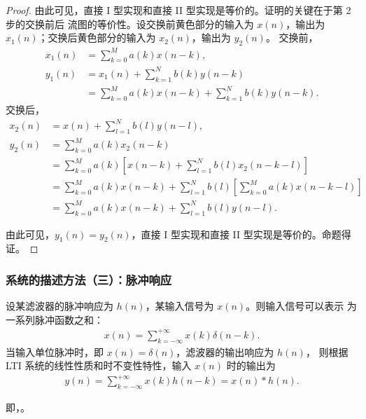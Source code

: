 \begin{proof}
    由此可见，直接 I 型实现和直接 II 型实现是等价的。证明的关键在于第 2 步的交换前后
    流图的等价性。设交换前黄色部分的输入为 $x(n)$，输出为 $x_1(n)$；交换后黄色部分的输入为 $x_2(n)$，输出为 $y_2(n)$。
    交换前，
    \begin{align*}
        x_1(n) & = \sum_{k = 0}^{M}a(k)x(n - k), \\
        y_1(n) & = x_1(n) + \sum_{k = 1}^{N}b(k)y(n - k) \\
        & = \sum_{k = 0}^{M}a(k)x(n - k) + \sum_{k = 1}^{N}b(k)y(n - k).
    \end{align*}
    交换后，
    \begin{align*}
        x_2(n) & = x(n) + \sum_{l = 1}^{N}b(l)y(n - l), \\
        y_2(n) & = \sum_{k = 0}^{M}a(k)x_2(n - k) \\
        & = \sum_{k = 0}^{M}a(k)[x(n - k) + \sum_{l = 1}^{N}b(l)x_2(n - k - l)] \\
        & = \sum_{k = 0}^{M}a(k)x(n - k) + \sum_{l = 1}^{N}b(l)[\sum_{k = 0}^{M}a(k)x(n - k - l)] \\
        & = \sum_{k = 0}^{M}a(k)x(n - k) + \sum_{l = 1}^{N}b(l)y(n - l).
    \end{align*}

    由此可见，$y_1(n) = y_2(n)$，直接 I 型实现和直接 II 型实现是等价的。命题得证。
\end{proof}

\subsubsection{系统的描述方法（三）：脉冲响应}

\label{subsubsection:pulse-response-representation}

\begin{theorem}
    设某滤波器的脉冲响应为 $h(n)$，某输入信号为 $x(n)$。则输入信号可以表示
    为一系列脉冲函数之和：
    \begin{align*}
        x(n) = \sum_{k = -\infty}^{+\infty}x(k)\delta(n - k).
    \end{align*}
    当输入单位脉冲时，即 $x(n) = \delta(n)$，滤波器的输出响应为 $h(n)$，
    则根据 LTI 系统的线性性质和时不变性特性，输入 $x(n)$ 时的输出为
    \begin{align*}
        y(n) = \sum_{k = -\infty}^{+\infty}x(k)h(n - k) = x(n) * h(n).
    \end{align*}
    
    即，。
\end{theorem}

